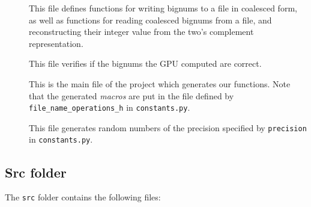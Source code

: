 \documentclass[10pt, a4paper]{report}
\begin{document}
\begin{description}
\item[]
This file defines functions for writing bignums to a file in coalesced form, as
well as functions for reading coalesced bignums from a file, and reconstructing
their integer value from the two's complement representation.

\item[]
This file verifies if the bignums the GPU computed are correct.

\item[]
This is the main file of the project which generates our functions.
Note that the generated \emph{macros} are put in the file defined by
\verb+file_name_operations_h+ in \verb+constants.py+.

\item[]
This file generates random numbers of the precision specified by
\verb+precision+ in \verb+constants.py+.
\end{description}

\subsection{Src folder}
The \verb+src+ folder contains the following files:
\end{document}

